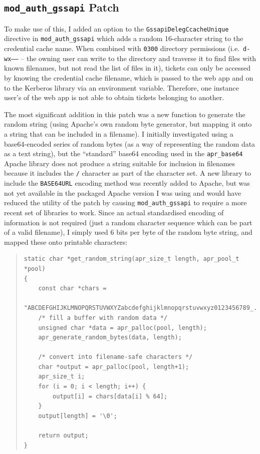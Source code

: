 \documentclass[12pt]{report}
\begin{document}
\subsection{\texttt{mod\_auth\_gssapi} Patch}
To make use of this, I added an option to the \texttt{GssapiDelegCcacheUnique} directive in \verb+mod_auth_gssapi+ which adds a random 16-character string to the credential cache name. When combined with \texttt{0300} directory permissions (i.e.\ \texttt{d-wx------} -- the owning user can write to the directory and traverse it to find files with known filenames, but not read the list of files in it), tickets can only be accessed by knowing the credential cache filename, which is passed to the web app and on to the Kerberos library via an environment variable. Therefore, one instance user's of the web app is not able to obtain tickets belonging to another.

The most significant addition in this patch was a new function to generate the random string (using Apache's own random byte generator, but mapping it onto a string that can be included in a filename). I initially investigated using a base64-encoded series of random bytes (as a way of representing the random data as a text string), but the ``standard'' base64 encoding used in the \verb+apr_base64+ Apache library does not produce a string suitable for inclusion in filenames because it includes the \verb+/+ character as part of the character set\cite{RFC4648}. A new library to include the \texttt{BASE64URL} encoding method was recently added to Apache\cite{Apache-base64-commit}, but was not yet available in the packaged Apache version I was using and would have reduced the utility of the patch by causing \verb+mod_auth_gssapi+ to require a more recent set of libraries to work. Since an actual standardised encoding of information is not required (just a random character sequence  which can be part of a valid filename), I simply used 6 bits per byte of the random byte string, and mapped these onto printable characters:

\begin{quote}
\begin{verbatim}
static char *get_random_string(apr_size_t length, apr_pool_t *pool)
{
    const char *chars =
     "ABCDEFGHIJKLMNOPQRSTUVWXYZabcdefghijklmnopqrstuvwxyz0123456789_.";
    /* fill a buffer with random data */
    unsigned char *data = apr_palloc(pool, length);
    apr_generate_random_bytes(data, length);

    /* convert into filename-safe characters */
    char *output = apr_palloc(pool, length+1);
    apr_size_t i;
    for (i = 0; i < length; i++) {
        output[i] = chars[data[i] % 64];
    }
    output[length] = '\0';

    return output;
}
\end{verbatim}
\end{quote}
\end{document}
